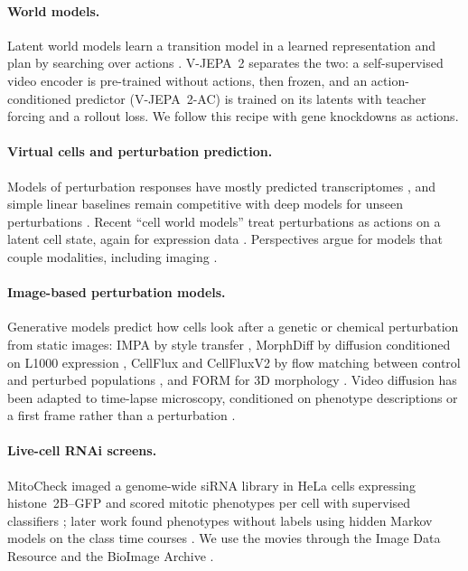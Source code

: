 \paragraph{World models.} Latent world models learn a transition model in a learned
representation and plan by searching over actions \citep{ha2018worldmodels,hafner2025dreamer}.
V-JEPA~2 \citep{assran2025vjepa2} separates the two: a self-supervised video encoder is
pre-trained without actions, then frozen, and an action-conditioned predictor (V-JEPA~2-AC) is
trained on its latents with teacher forcing and a rollout loss. We follow this recipe with gene
knockdowns as actions.

\paragraph{Virtual cells and perturbation prediction.} Models of perturbation responses have
mostly predicted transcriptomes \citep{roohani2024gears}, and simple linear baselines remain
competitive with deep models for unseen perturbations \citep{ahlmanneltze2025baselines}.
Recent ``cell world models'' treat perturbations as actions on a latent cell state, again for
expression data \citep{qiu2026chreode,miao2026vclmu,chuai2026alphacell}. Perspectives argue for
models that couple modalities, including imaging \citep{bunne2024virtualcell,xing2026worldmodel}.

\paragraph{Image-based perturbation models.} Generative models predict how cells look after a
genetic or chemical perturbation from static images: IMPA by style transfer
\citep{palma2025impa}, MorphDiff by diffusion conditioned on L1000 expression
\citep{wang2025morphdiff}, CellFlux and CellFluxV2 by flow matching between control and perturbed
populations \citep{zhang2025cellflux,zhang2026cellfluxv2}, and FORM for 3D morphology
\citep{naidoo2025form}. Video diffusion has been adapted to time-lapse microscopy, conditioned on
phenotype descriptions or a first frame rather than a perturbation
\citep{holmberg2025videodiffusion}.

\paragraph{Live-cell RNAi screens.} MitoCheck imaged a genome-wide siRNA library in HeLa cells
expressing histone~2B--GFP and scored mitotic phenotypes per cell with supervised classifiers
\citep{neumann2010mitocheck,held2010cellcognition}; later work found phenotypes without labels
using hidden Markov models on the class time courses \citep{failmezger2013unsupervised}. We use
the movies through the Image Data Resource and the BioImage Archive
\citep{williams2017idr,hartley2022bia}.

